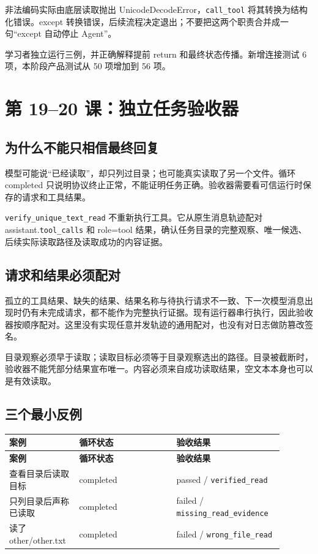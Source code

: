 非法编码实际由底层读取抛出 UnicodeDecodeError，\nolinkurl{call_tool} 将其转换为结构化错误。except 转换错误，后续流程决定退出；不要把这两个职责合并成一句“except 自动停止 Agent”。

学习者独立运行三例，并正确解释提前 return 和最终状态传播。新增连接测试 6 项，本阶段产品测试从 50 项增加到 56 项。

\section{第 19–20 课：独立任务验收器}

\subsection{为什么不能只相信最终回复}

模型可能说“已经读取”，却只列过目录；也可能真实读取了另一个文件。循环 completed 只说明协议终止正常，不能证明任务正确。验收器需要看可信运行时保存的请求和工具结果。

\nolinkurl{verify_unique_text_read} 不重新执行工具。它从原生消息轨迹配对 assistant.\nolinkurl{tool_calls} 和 role=tool 结果，确认任务目录的完整观察、唯一候选、后续实际读取路径及读取成功的内容证据。

\subsection{请求和结果必须配对}

孤立的工具结果、缺失的结果、结果名称与待执行请求不一致、下一次模型消息出现时仍有未完成请求，都不能作为完整执行证据。现有运行器串行执行，因此验收器按顺序配对。这里没有实现任意并发轨迹的通用配对，也没有对日志做防篡改签名。

目录观察必须早于读取；读取目标必须等于目录观察选出的路径。目录被截断时，验收器不能凭部分结果宣布唯一。内容必须来自成功读取结果，空文本本身也可以是有效读取。

\subsection{三个最小反例}

{\small\setlength{\tabcolsep}{4pt}
\renewcommand{\arraystretch}{1.25}
\begin{longtable}{>{\raggedright\arraybackslash}p{0.23\linewidth}>{\raggedright\arraybackslash}p{0.33\linewidth}>{\raggedright\arraybackslash}p{0.33\linewidth}}
\toprule
\textbf{案例} & \textbf{循环状态} & \textbf{验收结果} \\
\midrule\endfirsthead
\toprule
\textbf{案例} & \textbf{循环状态} & \textbf{验收结果} \\
\midrule\endhead
\bottomrule\endfoot
查看目录后读取目标 & completed & passed / \nolinkurl{verified_read} \\
只列目录后声称已读取 & completed & failed / \nolinkurl{missing_read_evidence} \\
读了 other/other.txt & completed & failed / \nolinkurl{wrong_file_read} \\
\end{longtable}}

